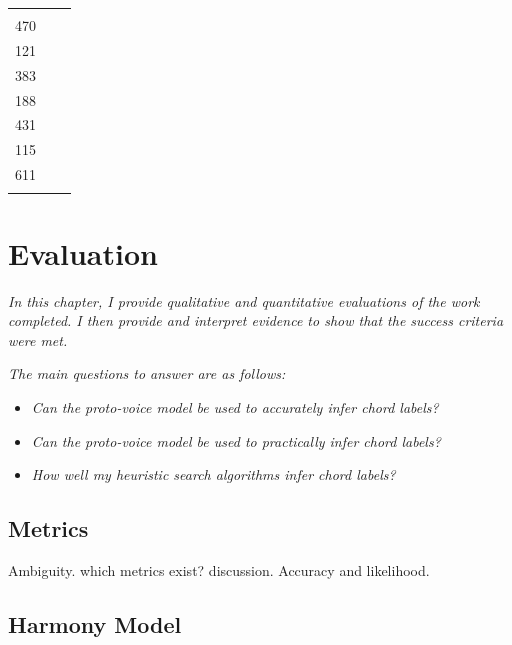 \documentclass[12pt,a4paper,twoside,openright]{report} \usepackage[pdfborder={0 0 0}]{hyperref}    %
\theoremstyle{definition} \newtheorem{definition}{Definition}[section]
\begin{document}
{\begin{table}[h]
\begin{tabularx}{\textwidth}{l X c}
\begin{minipage}[t]{8cm}
    \end{minipage} & \begin{minipage}[t]{0.5cm} 2272 \vspace{0.1\DTbaselineskip}\\ 470\\ \vspace{\DTbaselineskip} 121\\
\vspace{\DTbaselineskip} 383\\ \vspace{1.8\DTbaselineskip} 188\\ \vspace{3.7\DTbaselineskip} 431\\
\vspace{3\DTbaselineskip} 115\\ \vspace{2.5\DTbaselineskip} 611\\ \end{minipage} \end{tabularx} \end{table} }


\chapter{Evaluation} \textit{In this chapter, I provide qualitative and quantitative evaluations of the work completed.
I then provide and interpret evidence to show that the success criteria were met.}

\textit{The main questions to answer are as follows:} \begin{itemize} \item \textit{Can the proto-voice model be used to
accurately infer chord labels?} \item \textit{Can the proto-voice model be used to practically infer chord labels?}
\item \textit{How well my heuristic search algorithms infer chord labels?} \end{itemize}

  \section{Metrics} Ambiguity. which metrics exist? discussion. Accuracy and likelihood.

  \section{Harmony Model}
\end{document}
